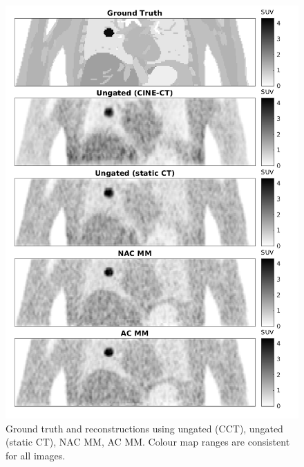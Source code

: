             \begin{figure}
                \centering
                
                \includegraphics[width=1.0\linewidth]{figures/motion_correction_1_results_2_visual_analysis.png}
                
                \captionsetup{singlelinecheck=false}
                \caption{
                    Ground truth and reconstructions using ungated (\gls{CCT}), ungated (static \gls{CT}), \gls{NAC} \gls{MM}, \gls{AC} \gls{MM}. Colour map ranges are consistent for all images.
                }
                \label{fig:pet_ct_respiratory_motion_correction_with_a_single_attenuation_map_using_nAC_derived_deformation_fields_results_visual_analysis}
            \end{figure}
            
